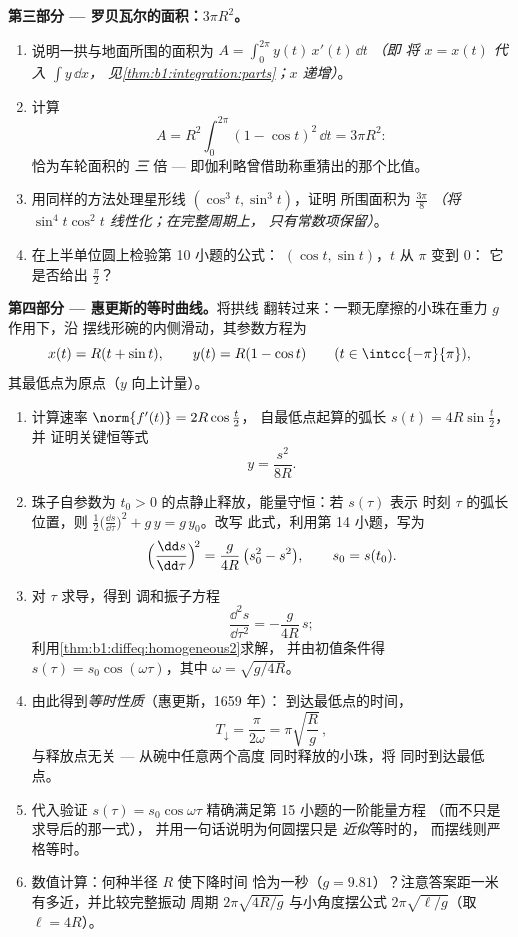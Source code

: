 \begin{problem}
\medskip
\noindent\textbf{第三部分 --- 罗贝瓦尔的面积：$3\pi R^2$。}
\begin{enumerate}[resume]
  \item 说明一拱与地面所围的面积为
        $A = \int_0^{2\pi} y(t)\,x'(t)\,\dd t$ \emph{（即
        将 $x = x(t)$ 代入 $\int y\,\dd x$，
        见\cref{thm:b1:integration:parts}；$x$ 递增）}。
  \item 计算
        \[
        A = R^2\int_0^{2\pi}(1 - \cos t)^2\,\dd t = 3\pi R^2 :
        \]
        恰为车轮面积的 \emph{三} 倍 ---
        即伽利略曾借助称重猜出的那个比值。
  \item 用同样的方法处理星形线 $(\cos^3t, \sin^3t)$，证明
        所围面积为 $\frac{3\pi}8$
        \emph{（将 $\sin^4 t\cos^2 t$ 线性化；在完整周期上，
        只有常数项保留）}。
  \item 在上半单位圆上检验第 10 小题的公式：
        $(\cos t, \sin t)$，$t$ 从 $\pi$ 变到 $0$：
        它是否给出 $\frac\pi2$？
\end{enumerate}

\medskip
\noindent\textbf{第四部分 --- 惠更斯的等时曲线。}将拱线
        翻转过来：一颗无摩擦的小珠在重力 $g$ 作用下，沿
        摆线形碗的内侧滑动，其参数方程为
\[
x(t) = R(t + \sin t), \qquad y(t) = R(1 - \cos t)
\qquad (t \in \intcc{-\pi}{\pi}),
\]
        其最低点为原点（$y$ 向上计量）。
\begin{enumerate}[resume]
  \item 计算速率 $\norm{f'(t)} = 2R\cos\frac t2$，
        自最低点起算的弧长 $s(t) = 4R\sin\frac t2$，并
        证明关键恒等式
        \[
        y = \frac{s^2}{8R} .
        \]
  \item 珠子自参数为
        $t_0 > 0$ 的点静止释放，能量守恒：若 $s(\tau)$ 表示
        时刻 $\tau$ 的弧长位置，则 $\frac12\bigl(
        \frac{\dd s}{\dd\tau}\bigr)^2 + g\,y = g\,y_0$。改写
        此式，利用第 14 小题，写为
        \[
        \Bigl(\frac{\dd s}{\dd\tau}\Bigr)^{\!2}
        = \frac{g}{4R}\,\bigl(s_0^2 - s^2\bigr),
        \qquad s_0 = s(t_0).
        \]
  \item 对 $\tau$ 求导，得到
        调和振子方程
        \[
        \frac{\dd^2 s}{\dd\tau^2} = -\frac{g}{4R}\,s ;
        \]
        利用\cref{thm:b1:diffeq:homogeneous2}求解，
        并由初值条件得 $s(\tau) = s_0\cos(\omega\tau)$，其中
        $\omega = \sqrt{g/4R}$。
  \item 由此得到\emph{等时性质}（惠更斯，1659 年）：
        到达最低点的时间，
        \[
        T_{\downarrow} = \frac{\pi}{2\omega}
        = \pi\sqrt{\frac Rg}\,,
        \]
        与释放点无关 --- 从碗中任意两个高度
        同时释放的小珠，将
        同时到达最低点。
  \item 代入验证 $s(\tau) =
        s_0\cos\omega\tau$ 精确满足第 15 小题的一阶能量方程
        （而不只是求导后的那一式），
        并用一句话说明为何圆摆只是
        \emph{近似}等时的，
        而摆线则严格等时。
  \item 数值计算：何种半径 $R$ 使下降时间
        恰为一秒（$g = 9.81$）？注意答案距一米
        有多近，并比较完整振动
        周期 $2\pi\sqrt{4R/g}$ 与小角度摆公式
        $2\pi\sqrt{\ell/g}$（取 $\ell = 4R$）。
\end{enumerate}


\end{problem}
